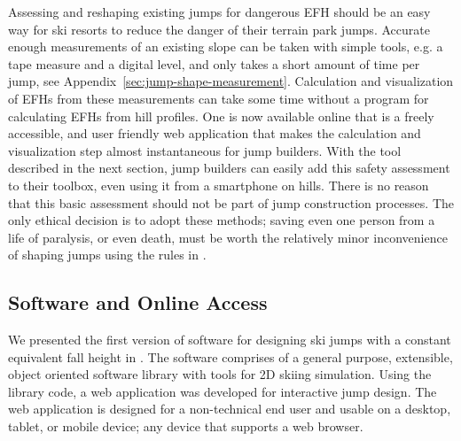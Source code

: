 \documentclass[smallextended]{svjour3}       %
\begin{document}
Assessing and reshaping existing jumps for dangerous EFH should be an easy way for ski resorts to reduce the danger of their terrain
park jumps. Accurate enough measurements of an existing slope can be taken with
simple tools, e.g. a tape measure and a digital level, and only takes a short
amount of time per jump, see Appendix~\ref{sec:jump-shape-measurement}.  Calculation and visualization of EFHs  from these
measurements can take some time without a program for calculating
EFHs from hill profiles. One is now available online that is
a freely accessible, and user friendly web application that makes the calculation
and visualization step almost instantaneous for jump builders. With
the tool described in the next section, jump builders can easily add
this safety assessment to their toolbox, even using it from a smartphone on hills. There is no reason that this basic assessment should not be part
of jump construction processes. The only ethical decision is to adopt these
methods; saving even one person from a life of paralysis, or even death,
must be worth the relatively minor inconvenience of shaping jumps using the rules in
\cite{Levy2015}.


\subsection{Software and Online Access}
\label{sec:software}
%
We presented the first version of software for designing ski jumps with a
constant equivalent fall height in \cite{Moore2018}. The software comprises of
a general purpose, extensible, object oriented software library with tools for
2D skiing simulation. Using the library code, a web application was developed
for interactive jump design. The web application is designed for a
non-technical end user and usable on a desktop, tablet, or mobile device; any
device that supports a web browser.
\end{document}
